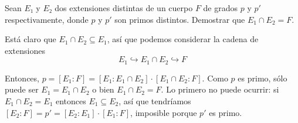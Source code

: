 \begin{problem}[3]
Sean $E₁$ y $E₂$ dos extensiones distintas de un cuerpo $F$ de grados $p$ y $p'$ respectivamente, donde $p$ y $p'$ son
primos distintos. Demostrar que $E_1 ∩ E_2 = F$.

\solution

Está claro que $E_1 ∩ E_2 ⊆ E_1$, así que podemos considerar la cadena de extensiones \[ E_1 \hookrightarrow E_1 ∩ E_2 \hookrightarrow F \]

Entonces, $p = [E_1 : F] = [E_1 : E_1 ∩ E_2] · [E_1 ∩ E_2 : F]$. Como $p$ es primo, sólo puede ser $E_1 = E_1 ∩ E_2$ o bien $E_1 ∩ E_2 = F$. Lo primero no puede ocurrir: si $E_1 ∩ E_2 = E_1$ entonces $E_1 ⊆ E_2$, así que tendríamos $[E_2:F] = p' = [E_2 : E_1] · [E_1 : F]$, imposible porque $p'$ es primo.

\end{problem}

